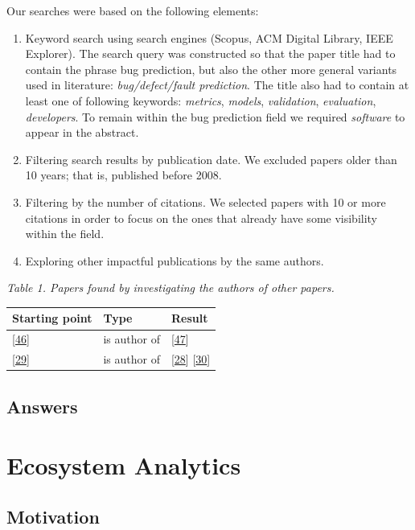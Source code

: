 \documentclass[]{book}
\begin{document}
Our searches were based on the following elements:

\begin{enumerate}
\def\labelenumi{\arabic{enumi}.}
\item
  Keyword search using search engines (Scopus, ACM Digital Library, IEEE
  Explorer). The search query was constructed so that the paper title
  had to contain the phrase bug prediction, but also the other more
  general variants used in literature: \emph{bug/defect/fault
  prediction}. The title also had to contain at least one of following
  keywords: \emph{metrics}, \emph{models}, \emph{validation},
  \emph{evaluation}, \emph{developers}. To remain within the bug
  prediction field we required \emph{software} to appear in the
  abstract.
\item
  Filtering search results by publication date. We excluded papers older
  than 10 years; that is, published before 2008.
\item
  Filtering by the number of citations. We selected papers with 10 or
  more citations in order to focus on the ones that already have some
  visibility within the field.
\item
  Exploring other impactful publications by the same authors.
\end{enumerate}

\emph{Table 1. Papers found by investigating the authors of other
papers.}

\begin{longtable}[]{@{}lll@{}}
\toprule
Starting point & Type & Result\tabularnewline
\midrule
\endhead
{[}\protect\hyperlink{ref-DAmbros2010}{46}{]} & is author of &
{[}\protect\hyperlink{ref-DAmbros2012}{47}{]}\tabularnewline
{[}\protect\hyperlink{ref-Catal2009review}{29}{]} & is author of &
{[}\protect\hyperlink{ref-Catal2011}{28}{]}
{[}\protect\hyperlink{ref-Catal2009investigating}{30}{]}\tabularnewline
\bottomrule
\end{longtable}

\section{Answers}\label{answers-1}

\chapter{Ecosystem Analytics}\label{ecosystem-analytics}

\section{Motivation}\label{motivation-3}
\end{document}
